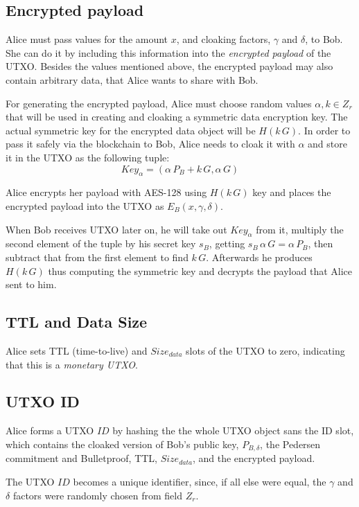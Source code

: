 \documentclass[8pt,fleqn,openany]{book}
\begin{document}
{		\subsection{Encrypted payload} Alice must pass values for the amount $x$, and cloaking factors, $\gamma$ and $\delta$, to Bob. She can do it by including this information into the \textit{encrypted payload} of the UTXO. Besides the values mentioned above, the encrypted payload may also contain arbitrary data, that Alice wants to share with Bob. 
		
		For generating the encrypted payload, Alice must choose random values $\alpha, k \in Z_r$ that will be used in creating and cloaking a symmetric data encryption key.
		The actual symmetric key for the encrypted data object will be $H(k \, G)$. In order to pass it safely via the blockchain to Bob, Alice needs to cloak it with $\alpha$ and store it in the UTXO as the following tuple: $$\mathit{Key}_{\alpha} = (\alpha \, P_{B} + k \, G, \alpha \, G )$$ 
		
		Alice encrypts her payload with AES-128 using $H(k \, G)$ key and places the encrypted payload into the UTXO as $E_B(x, \gamma, \delta)$.
		
		When Bob receives UTXO later on, he will take out $\mathit{Key}_{\alpha}$ from it, multiply the second element of the tuple by his secret key $s_B$, getting $s_B \, \alpha \, G = \alpha \, P_B$, then subtract that from the first element to find $k \, G$. Afterwards he produces $H(k \, G)$ thus computing the symmetric key and decrypts the payload that Alice sent to him.
		
		\subsection{TTL and Data Size} Alice sets TTL (time-to-live) and $Size_{data}$ slots of the UTXO to zero, indicating that this is a \textit{monetary UTXO}. 
		
		\subsection{UTXO ID} Alice forms a UTXO $\mathit{ID}$ by hashing the the whole UTXO object sans the ID slot, which contains the cloaked version of Bob’s public key, $P_{B, \delta}$, the Pedersen commitment and Bulletproof, TTL, $Size_{data}$, and the encrypted payload.
		
		The UTXO $\mathit{ID}$ becomes a unique identifier, since, if all else were equal, the $\gamma$ and $\delta$ factors were randomly chosen from field $Z_r$.
		
}
\end{document}
